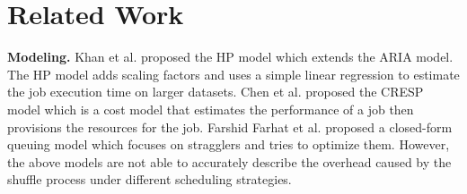 \section{Related Work}\label{related}

{\color{black}
\textbf{Modeling.} 
Khan et al. \cite{khan2016hadoop} proposed the HP model which extends the ARIA model. The HP model adds scaling factors and uses a simple linear regression to estimate the job execution time on larger datasets.
Chen et al. \cite{chen2014cresp} proposed the CRESP model which is a cost model that estimates the performance of a job then provisions the resources for the job.
Farshid Farhat et al.\cite{farhat2016stochastic} proposed a closed-form queuing model which focuses on stragglers and tries to optimize them. 
However, the above models are not able to accurately describe the overhead caused by the shuffle process under different scheduling strategies. 

}
